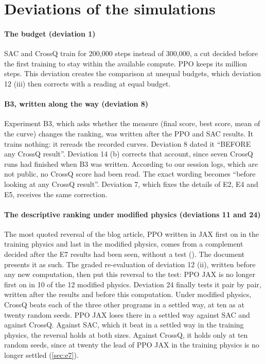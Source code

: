 \section{Deviations of the simulations}
\label{sec:ecarts-sim}

\paragraph{The budget (deviation 1)} SAC and CrossQ train for 200{,}000 steps instead of 300{,}000, a
cut decided before the first training to stay within the available compute. PPO keeps its million
steps. This deviation creates the comparison at unequal budgets, which deviation 12 (iii) then
corrects with a reading at equal budget.

\paragraph{B3, written along the way (deviation 8)} Experiment B3, which asks whether the measure
(final score, best score, mean of the curve) changes the ranking, was written
after the PPO and SAC results. It trains nothing: it rereads the recorded curves. Deviation 8
dated it \enquote{BEFORE any CrossQ result}. Deviation 14 (b) corrects that account, since seven
CrossQ runs had finished when B3 was written. According to our session logs, which are not public,
no CrossQ score had been read. The exact wording becomes \enquote{before looking at any CrossQ result}.
Deviation 7, which fixes the details of E2, E4 and E5, receives the same correction.

\paragraph{The descriptive ranking under modified physics (deviations 11 and 24)} The most quoted
reversal of the blog article, PPO written in JAX first on  in the training physics and
last in the modified physics, comes from a complement decided after the E7 results had been seen,
without a test (). The document presents it as such. The graded
re-evaluation of deviation 12 (ii), written before any new computation, then put this reversal to the
test: PPO JAX is no longer first on  in 10 of the 12 modified physics. Deviation 24
finally tests it pair by pair, written after the results and before this computation. Under modified
physics, CrossQ beats each of the three other programs in a settled way, at ten as at twenty random
seeds. PPO JAX loses there in a settled way against SAC and against CrossQ. Against SAC, which it
beat in a settled way in the training physics, the reversal holds at both sizes. Against CrossQ, it
holds only at ten random seeds, since at twenty the lead of PPO JAX in the training physics is no
longer settled (\cref{sec:e7}).

